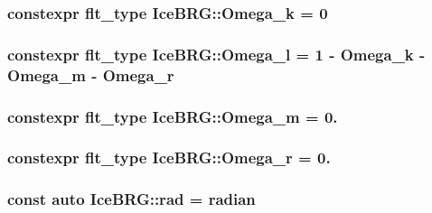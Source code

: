 \subsubsection[{Omega\+\_\+k}]{\setlength{\rightskip}{0pt plus 5cm}constexpr {\bf flt\+\_\+type} Ice\+B\+R\+G\+::\+Omega\+\_\+k = 0}\label{namespaceIceBRG_afb35c6ac056f6db5d60d8cb03a7b997a}
\hypertarget{namespaceIceBRG_adb990b0d239fa166345fc328d173dfec}{}
\subsubsection[{Omega\+\_\+l}]{\setlength{\rightskip}{0pt plus 5cm}constexpr {\bf flt\+\_\+type} Ice\+B\+R\+G\+::\+Omega\+\_\+l = 1 -\/ {\bf Omega\+\_\+k} -\/ {\bf Omega\+\_\+m} -\/ {\bf Omega\+\_\+r}}\label{namespaceIceBRG_adb990b0d239fa166345fc328d173dfec}
\hypertarget{namespaceIceBRG_acddabe6e9443c1f8cb4b3c1093342aa3}{}
\subsubsection[{Omega\+\_\+m}]{\setlength{\rightskip}{0pt plus 5cm}constexpr {\bf flt\+\_\+type} Ice\+B\+R\+G\+::\+Omega\+\_\+m = 0.}\label{namespaceIceBRG_acddabe6e9443c1f8cb4b3c1093342aa3}
\hypertarget{namespaceIceBRG_a8861a491b3586ab09c51c1bfc9020698}{}
\subsubsection[{Omega\+\_\+r}]{\setlength{\rightskip}{0pt plus 5cm}constexpr {\bf flt\+\_\+type} Ice\+B\+R\+G\+::\+Omega\+\_\+r = 0.}\label{namespaceIceBRG_a8861a491b3586ab09c51c1bfc9020698}
\hypertarget{namespaceIceBRG_a556de4acca26a5661d50a5b75880e95f}{}
\subsubsection[{rad}]{\setlength{\rightskip}{0pt plus 5cm}const auto Ice\+B\+R\+G\+::rad = {\bf radian}}\label{namespaceIceBRG_a556de4acca26a5661d50a5b75880e95f}
\hypertarget{namespaceIceBRG_af78fec3f42ee23d596793328b8991468}{}
